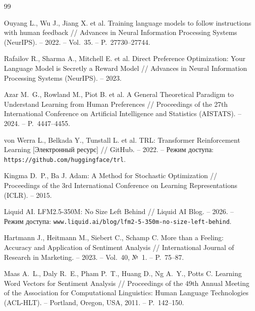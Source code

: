 \documentclass[a4paper,12pt]{article}
\begin{document}
\newpage
\begin{thebibliography}{99}

Ouyang L., Wu J., Jiang X. et al. Training language models to follow instructions with human feedback // Advances in Neural Information Processing Systems (NeurIPS). -- 2022. -- Vol.~35. -- P.~27730--27744.

Rafailov R., Sharma A., Mitchell E. et al. Direct Preference Optimization: Your Language Model is Secretly a Reward Model // Advances in Neural Information Processing Systems (NeurIPS). -- 2023.

Azar M.~G., Rowland M., Piot B. et al. A General Theoretical Paradigm to Understand Learning from Human Preferences // Proceedings of the 27th International Conference on Artificial Intelligence and Statistics (AISTATS). -- 2024. -- P.~4447--4455.

von Werra L., Belkada Y., Tunstall L. et al. TRL: Transformer Reinforcement Learning [Электронный ресурс] // GitHub. -- 2022. -- Режим доступа: \texttt{https://github.com/huggingface/trl}.

Kingma D.~P., Ba J. Adam: A Method for Stochastic Optimization // Proceedings of the 3rd International Conference on Learning Representations (ICLR). -- 2015.

Liquid AI. LFM2.5-350M: No Size Left Behind // Liquid AI Blog. -- 2026. -- Режим доступа: \texttt{www.liquid.ai/blog/lfm2-5-350m-no-size-left-behind}.

Hartmann J., Heitmann M., Siebert C., Schamp C. More than a Feeling: Accuracy and Application of Sentiment Analysis // International Journal of Research in Marketing. -- 2023. -- Vol.~40, №~1. -- P.~75--87.

Maas A.~L., Daly R.~E., Pham P.~T., Huang D., Ng A.~Y., Potts C. Learning Word Vectors for Sentiment Analysis // Proceedings of the 49th Annual Meeting of the Association for Computational Linguistics: Human Language Technologies (ACL-HLT). -- Portland, Oregon, USA, 2011. -- P.~142--150.

\end{thebibliography}
\end{document}
